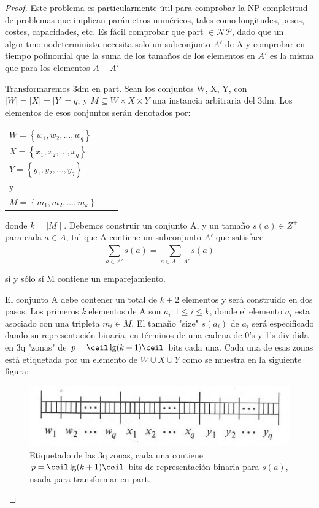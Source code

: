 \documentclass[11pt, a4paper]{memoir}
\begin{document}
\begin{proof}
Este problema es particularmente útil para comprobar la NP-completitud de problemas que implican parámetros numéricos, tales como longitudes, pesos, costes, capacidades, etc.
Es fácil comprobar que \gls{part} $\in \mathcal{NP}$, dado que un algoritmo nodeterminista necesita solo un subconjunto $A'$ de A y comprobar en tiempo polinomial que la suma de los tamaños de los elementos en $A'$ es la misma que para los elementos $A-A'$ \par
Transformaremos \gls{3dm} en \gls{part}. Sean los conjuntos W, X, Y, con $\mid W \mid= \mid X \mid = \mid Y \mid = q$, y $M \subseteq W \times X \times Y$ una instancia arbitraria del \gls{3dm}. Los elementos de esos conjuntos serán denotados por: 

\vspace{0.2cm}
\begin{tabular}{@{}lll@{}}
    $W=\left \{ w_1, w_2, \dots, w_q \right \}$ \\
    $X=\left \{ x_1, x_2, \dots, x_q \right \}$ \\ 
    $Y=\left \{ y_1, y_2, \dots, y_q \right \}$ \\
    y \\
    $M=\left \{ m_1, m_2, \dots, m_k \right \}$ 
\end{tabular}
\vspace{0.2cm}

donde $k=\mid M\mid$. Debemos construir un conjunto A, y un tamaño $s(a) \in Z^+$ para cada $a\in A$, tal que A contiene un subconjunto $A'$ que satisface \\

\[\sum_{a \in A'}^{} s(a) = \sum_{a \in A-A'}^{} s(a)\]

sí y sólo sí M contiene un emparejamiento. 
\newpage

El conjunto A debe contener un total de $k+2$ elementos y será construido en dos pasos. Los primeros \textit{k} elementos de A son ${a_i:1\leq i\leq k}$, donde el elemento $a_i$ esta asociado con una tripleta $m_i\in M$. El tamaño "size" $s(a_i)$ de $a_i$ será especificado dando su representación binaria, en términos de una cadena de 0's y 1's dividida en 3q "zonas" de \(p= \ceil \lg (k+1) \ceil\) bits cada una. Cada una de esas zonas está etiquetada por un elemento de $ W\cup X \cup Y$ como se muestra en la siguiente figura: \\
\begin{figure}[H]
    \centering
    \includegraphics{figura1}
    \caption{Etiquetado de las 3q zonas, cada una contiene \(p= \ceil \lg (k+1) \ceil\) bits de representación binaria para $s(a)$, usada para transformar  en \gls{part}.}
    \label{fig:my_label}
\end{figure}
\par 


\end{proof}
\end{document}
